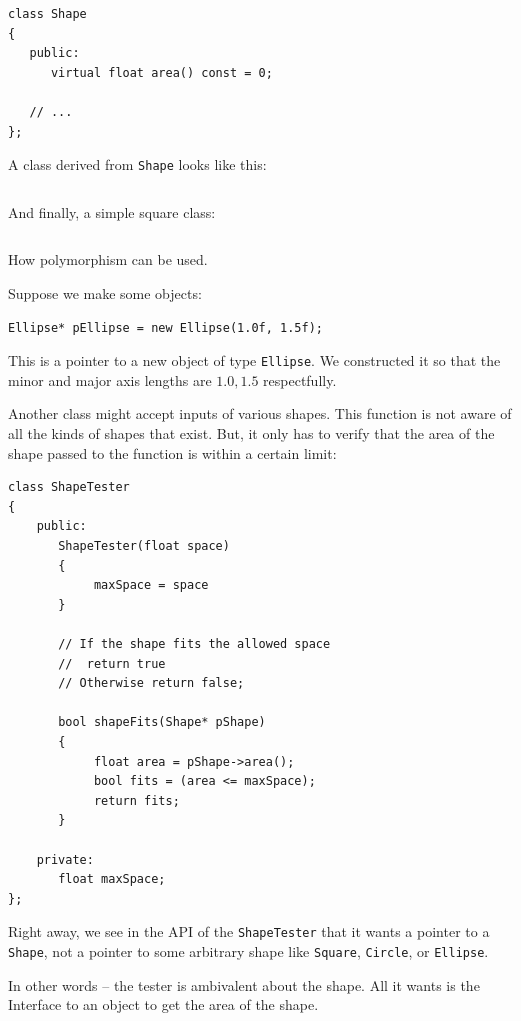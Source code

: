 \documentclass[12pt]{article}
\begin{document}
\begin{enumerate}
\begin{enumerate}
\begin{lstlisting}
class Shape
{
   public:
      virtual float area() const = 0;

   // ...
};
\end{lstlisting}

A class derived from {\texttt{Shape}} looks like this:


\begin{lstlisting}
\end{lstlisting}

And finally, a simple square class:

\begin{lstlisting}
\end{lstlisting}

How polymorphism can be used.

Suppose we make some objects:

\begin{lstlisting}
Ellipse* pEllipse = new Ellipse(1.0f, 1.5f);
\end{lstlisting}

This is a pointer to a new object of type {\texttt{Ellipse}}. We
constructed it so that the minor and major axis lengths are
$1.0, 1.5$ respectfully.

Another class might accept inputs of various shapes.  This function is
not aware of all the kinds of shapes that exist. But, it only has to 
verify that the area of the shape passed to the function is within a certain
limit:

\begin{lstlisting}
class ShapeTester
{
    public:
       ShapeTester(float space)
       {
            maxSpace = space
       }

       // If the shape fits the allowed space
       //  return true
       // Otherwise return false;
   
       bool shapeFits(Shape* pShape)
       {
            float area = pShape->area();
            bool fits = (area <= maxSpace);
            return fits;
       }

    private:
       float maxSpace;
};
\end{lstlisting}

Right away, we see in the API of the {\texttt{ShapeTester}} that
it wants a pointer to a {\texttt{Shape}}, not a pointer to
some arbitrary shape like {\texttt{Square}}, {\texttt{Circle}},
or {\texttt{Ellipse}}.

In other words -- the tester is ambivalent about the shape. All it
wants is the Interface to an object to get the area of the shape.


\end{enumerate}
\end{enumerate}
\end{document}
